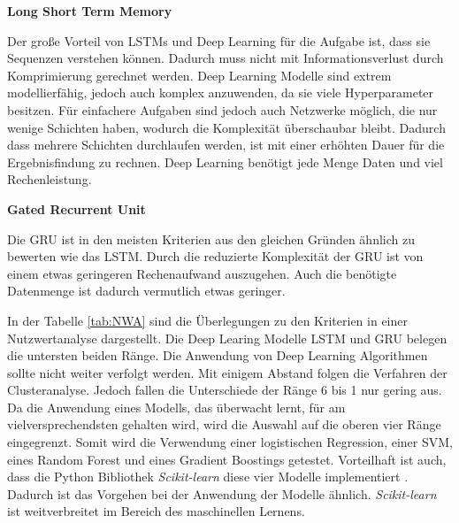 \textbf{Long Short Term Memory}\par
Der große Vorteil von LSTMs und Deep Learning für die Aufgabe ist, dass sie Sequenzen verstehen können. Dadurch muss nicht mit Informationsverlust durch Komprimierung gerechnet werden. Deep Learning Modelle sind extrem modellierfähig, jedoch auch komplex anzuwenden, da sie viele Hyperparameter besitzen. Für einfachere Aufgaben sind jedoch auch Netzwerke möglich, die nur wenige Schichten haben, wodurch die Komplexität überschaubar bleibt. Dadurch dass mehrere Schichten durchlaufen werden, ist mit einer erhöhten Dauer für die Ergebnisfindung zu rechnen. Deep Learning benötigt jede Menge Daten und viel Rechenleistung. \dubpar

\textbf{Gated Recurrent Unit}\par
Die GRU ist in den meisten Kriterien aus den gleichen Gründen ähnlich zu bewerten wie das LSTM. Durch die reduzierte Komplexität der GRU ist von einem etwas geringeren Rechenaufwand auszugehen. Auch die benötigte Datenmenge ist dadurch vermutlich etwas geringer.\dubpar

In der Tabelle \ref{tab:NWA} sind die Überlegungen zu den Kriterien in einer Nutzwertanalyse dargestellt. Die Deep Learing Modelle LSTM und GRU belegen die untersten beiden Ränge. Die Anwendung von Deep Learning Algorithmen sollte nicht weiter verfolgt werden. Mit einigem Abstand folgen die Verfahren der Clusteranalyse. Jedoch fallen die Unterschiede der Ränge 6 bis 1 nur gering aus. Da die Anwendung eines Modells, das überwacht lernt, für am vielversprechendsten gehalten wird, wird die Auswahl auf die oberen vier Ränge eingegrenzt. Somit wird die Verwendung einer logistischen Regression, einer SVM, eines Random Forest und eines Gradient Boostings getestet. Vorteilhaft ist auch, dass die \gls{Python} \gls{Bibliothek} \textit{Scikit-learn} diese vier Modelle implementiert \cite{FabianPedregosa.2011, Buitinck.2013}. Dadurch ist das Vorgehen bei der Anwendung der Modelle ähnlich. \textit{Scikit-learn} ist weitverbreitet im Bereich des maschinellen Lernens. 


